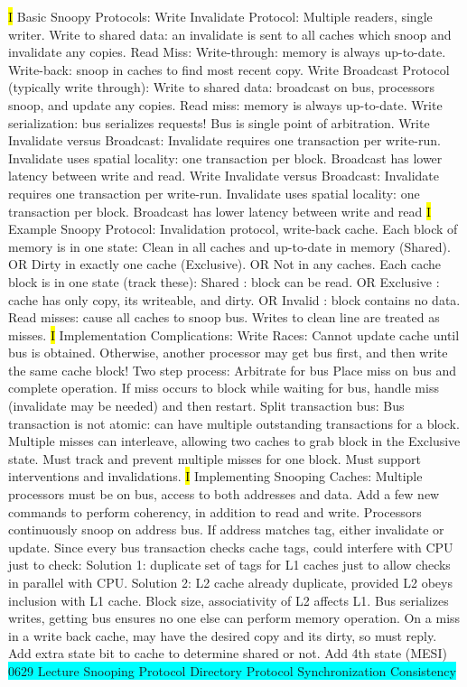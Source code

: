 \documentclass[fontsize=4pt]{scrartcl}
\begin{document}
\hl{I}
Basic Snoopy Protocols: Write Invalidate Protocol: Multiple readers, single writer. Write to shared data:  an invalidate is sent to all caches which snoop and invalidate any copies. Read Miss: Write-through: memory is always up-to-date. Write-back: snoop in caches to find most recent copy. Write Broadcast Protocol (typically write through): Write to shared data: broadcast on bus, processors snoop, and update any copies. Read miss: memory is always up-to-date. Write serialization: bus serializes requests! Bus is single point of arbitration. Write Invalidate versus Broadcast: Invalidate requires one transaction per write-run. Invalidate uses spatial locality: one transaction per block. Broadcast has lower latency between write and read. Write Invalidate versus Broadcast: Invalidate requires one transaction per write-run. Invalidate uses spatial locality: one transaction per block. Broadcast has lower latency between write and read
\hl{I}
Example Snoopy Protocol: Invalidation protocol, write-back cache. Each block of memory is in one state: Clean in all caches and up-to-date in memory (Shared). OR Dirty in exactly one cache (Exclusive). OR Not in any caches. Each cache block is in one state (track these): Shared : block can be read. OR Exclusive : cache has only copy, its writeable, and dirty. OR Invalid : block contains no data. Read misses: cause all caches to snoop bus. Writes to clean line are treated as misses.
\hl{I}
Implementation Complications: Write Races: Cannot update cache until bus is obtained. Otherwise, another processor may get bus first, and then write the same cache block! Two step process: Arbitrate for bus Place miss on bus and complete operation. If miss occurs to block while waiting for bus, handle miss (invalidate may be needed) and then restart. Split transaction bus: Bus transaction is not atomic: can have multiple outstanding transactions for a block. Multiple misses can interleave, allowing two caches to grab block in the Exclusive state. Must track and prevent multiple misses for one block. Must support interventions and invalidations.
\hl{I}
Implementing Snooping Caches: Multiple processors must be on bus, access to both addresses and data. Add a few new commands to perform coherency, in addition to read and write. Processors continuously snoop on address bus. If address matches tag, either invalidate or update. Since every bus transaction checks cache tags, could interfere with CPU just to check: Solution 1: duplicate set of tags for L1 caches just to allow checks in parallel with CPU. Solution 2: L2 cache already duplicate, provided L2 obeys inclusion with L1 cache. Block size, associativity of L2 affects L1. Bus serializes writes, getting bus ensures no one else can perform memory operation. On a miss in a write back cache, may have the desired copy and its dirty, so must reply. Add extra state bit to cache to determine shared or not. Add 4th state (MESI)
\colorbox{Cyan}{0629 Lecture Snooping Protocol Directory Protocol Synchronization Consistency}
\end{document}
